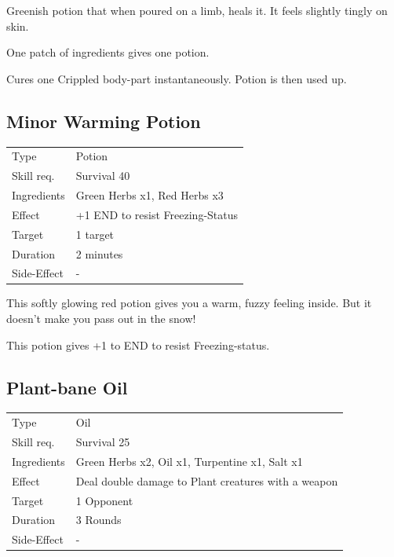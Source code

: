 \documentclass[11pt,a4paper,twocolumn]{book}
\begin{document}
\medskip

Greenish potion that when poured on a limb, heals it. It feels slightly tingly on skin.

One patch of ingredients gives one potion.

Cures one Crippled body-part instantaneously. Potion is then used up.

\vfill

\subsection*{Minor Warming Potion}
{
	\begin{tabu} to 75mm{| X[l,4] | X[l,8] |}
		\hline
		Type 			& Potion 													\\
        Skill req.	    & Survival 40 												\\
        Ingredients     & Green Herbs x1, Red Herbs x3								\\
        Effect     		& +1 END to resist Freezing-Status 							\\
        Target      	& 1 target													\\
        Duration  		& 2 minutes	 												\\
        Side-Effect     & -															\\ \hline
	\end{tabu}
		
}

\medskip

This softly glowing red potion gives you a warm, fuzzy feeling inside. But it doesn't make you pass out in the snow!

This potion gives +1 to END to resist Freezing-status.


\subsection*{Plant-bane Oil}
{
	\begin{tabu} to 75mm{| X[l,4] | X[l,8] |}
		\hline
		Type 			& Oil 														\\
        Skill req.	    & Survival 25 												\\
        Ingredients     & Green Herbs x2, Oil x1, Turpentine x1, Salt x1			\\
        Effect     		& Deal double damage to Plant creatures with a weapon 		\\
        Target      	& 1 Opponent												\\
        Duration  		& 3 Rounds	 												\\
        Side-Effect     & -															\\ \hline
	\end{tabu}
		
}
\end{document}
